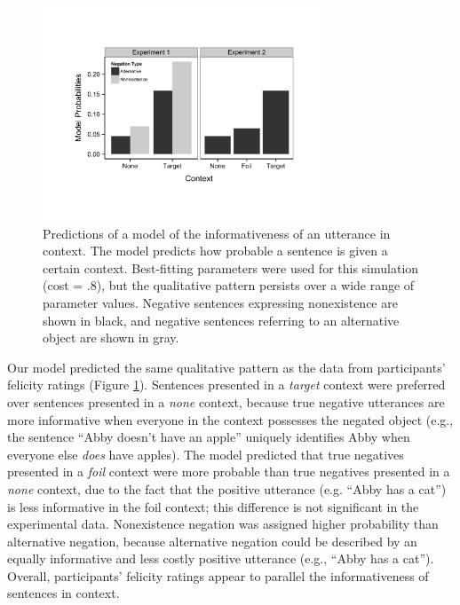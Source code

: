 \documentclass[man, noapacite]{apa2}
\begin{document}
\begin{figure}[t]
\begin{center} 
\includegraphics[width=3.25in]{figures/model_predictions.pdf}
\caption{\label{fig:model} Predictions of a model of the informativeness of an utterance in context.  The model predicts how probable a sentence is given a certain context.  Best-fitting parameters were used for this simulation (cost = .8), but the qualitative pattern persists over a wide range of parameter values.  Negative sentences expressing nonexistence are shown in black, and negative sentences referring to an alternative object are shown in gray.}
\vspace{-.2cm}
\end{center} 
\end{figure}

Our model predicted the same qualitative pattern as the data from participants' felicity ratings (Figure \ref{fig:model}).  Sentences presented in a \emph{target} context were preferred over sentences presented in a \emph{none} context, because true negative utterances are more informative when everyone in the context possesses the negated object (e.g., the sentence ``Abby doesn't have an apple'' uniquely identifies Abby when everyone else \emph{does} have apples).  The model predicted that true negatives presented in a \emph{foil} context were more probable than true negatives presented in a \emph{none} context, due to the fact that the positive utterance (e.g. ``Abby has a cat'')  is less informative in the foil context; this difference is not significant in the experimental data.  Nonexistence negation was assigned higher probability than alternative negation, because alternative negation could be described by an equally informative and less costly positive utterance (e.g., ``Abby has a cat'').  Overall, participants' felicity ratings appear to parallel the informativeness of sentences in context.  
\end{document}
